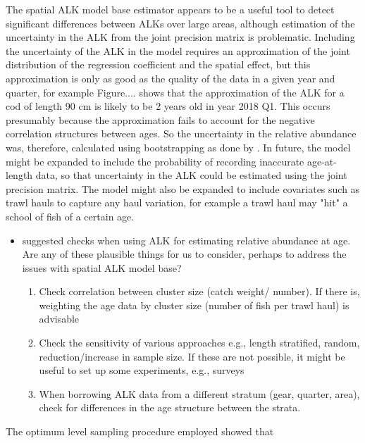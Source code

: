\documentclass[a4paper 12pt]{article}
\numberwithin{equation}{section}
\begin{document}
The spatial ALK model base estimator appears to be a useful tool to detect significant differences between ALKs over large areas, although estimation of the uncertainty in the ALK from the joint precision matrix is problematic. Including the uncertainty of the ALK in the model requires an approximation of the joint distribution of the regression coefficient and the spatial effect, but this approximation is only as good as the quality of the data in a given year and quarter, for example Figure.... shows that the approximation of the ALK for a cod of length 90 cm is likely to be 2 years old in year 2018 Q1. This occurs presumably because the approximation fails to account for the negative correlation structures between ages. So the uncertainty in the relative abundance was, therefore, calculated using bootstrapping as done by \citet{berg2012spatial,berg2014evaluation}. In future, the model might be expanded to include the probability of recording inaccurate age-at-length data, so that uncertainty in the ALK could be estimated using the joint precision matrix. The model might also be expanded to include covariates such as trawl hauls to capture any haul variation, for example a trawl haul may "hit" a school of fish  of a certain age. 

\begin{itemize}
\item \citet{aanes2015efficient} suggested checks when using ALK for estimating relative abundance at age. Are any of these plausible things for us to consider, perhaps to address the issues with spatial ALK model base?
\begin{enumerate}
\item Check correlation between cluster size (catch weight/ number). If there is, weighting the age data by cluster size (number of fish per trawl haul) is advisable
\item Check the sensitivity of various approaches e.g., length stratified, random, reduction/increase in sample size. If these are not possible, it might be useful to set up some experiments, e.g., surveys
\item When borrowing ALK data from a different stratum (gear, quarter, area), check for differences in the age structure between the strata.
\end{enumerate}
\end{itemize}

The optimum level sampling procedure employed showed that  

\end{document}
